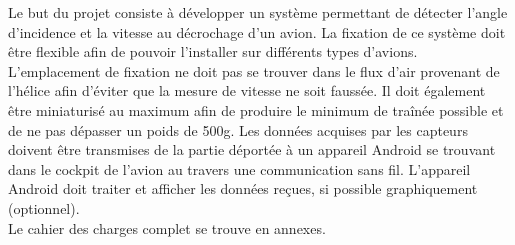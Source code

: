 Le but du projet consiste à développer un système permettant de détecter l’angle d’incidence et la vitesse au décrochage d’un avion. La fixation de ce système doit être flexible afin de pouvoir l’installer sur différents types d’avions. L’emplacement de fixation ne doit pas se trouver dans le flux d’air provenant de l’hélice afin d’éviter que la mesure de vitesse ne soit faussée. Il doit également être miniaturisé au maximum afin de produire le minimum de traînée possible et de ne pas dépasser un poids de 500g. Les données acquises par les capteurs doivent être transmises de la partie déportée à un appareil Android se trouvant dans le cockpit de l’avion au travers une communication sans fil. L’appareil Android doit traiter et afficher les données reçues, si possible graphiquement (optionnel). \\

\noindent Le cahier des charges complet se trouve en annexes.
\vspace{1 cm}

